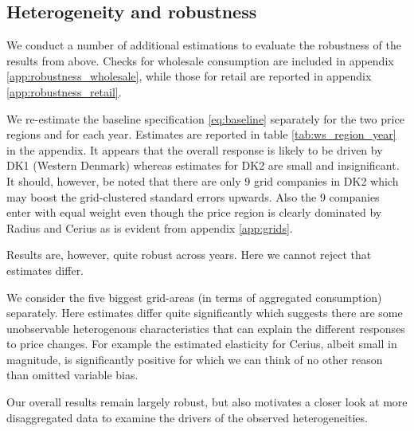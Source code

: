 \subsection{Heterogeneity and robustness}
\label{subsec:r_robustness}
\begin{comment}
Heterogeneous effects
\begin{figure}[H]
  \centering
  \caption{Wholesale elasticity by hour}
  \label{fig:ws_elasticity_hour}
\end{figure}

\begin{figure}[H]
  \centering
  \caption{Wholesale peak-elasticity by log grid size}
  \label{fig:ws_elasticity_grid}
\end{figure}
\end{comment}
We conduct a number of additional estimations to evaluate the robustness of the results from above. Checks for wholesale consumption are included in appendix \ref{app:robustness_wholesale}, while those for retail are reported in appendix \ref{app:robustness_retail}.
\par
We re-estimate the baseline specification \eqref{eq:baseline} separately for the two price regions and for each year. Estimates are reported in table \ref{tab:ws_region_year} in the appendix. It appears that the overall response is likely to be driven by DK1 (Western Denmark) whereas estimates for DK2 are small and insignificant. It should, however, be noted that there are only 9 grid companies in DK2 which may boost the grid-clustered standard errors upwards. Also the 9 companies enter with equal weight even though the price region is clearly dominated by Radius and Cerius as is evident from appendix \ref{app:grids}.
\par
Results are, however, quite robust across years. Here we cannot reject that estimates differ. \bigskip \par
We consider the five biggest grid-areas (in terms of aggregated consumption) separately. Here estimates differ quite significantly which suggests there are some unobservable heterogenous characteristics that can explain the different responses to price changes. For example the estimated elasticity for Cerius, albeit small in magnitude, is significantly positive for which we can think of no other reason than omitted variable bias. %

Our overall results remain largely robust, but also motivates a closer look at more disaggregated data to examine the drivers of the observed heterogeneities.

